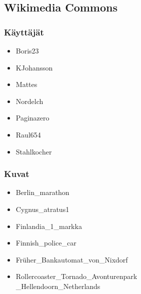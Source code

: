 \subsection*{Wikimedia Commons}
\begin{minipage}[t]{0.33\textwidth}
\subsubsection*{Käyttäjät}
\begin{itemize}
\item Boris23
\item KJohansson
\item Mattes
\item Nordelch
\item Paginazero
\item Raul654
\item Stahlkocher
\end{itemize}
\end{minipage}
\begin{minipage}[t]{0.67\textwidth}
\subsubsection*{Kuvat}
\begin{itemize}
\item Berlin\_marathon
\item Cygnus\_atratus1
\item Finlandia\_1\_markka
\item Finnish\_police\_car
\item Früher\_Bankautomat\_von\_Nixdorf
\item Rollercoaster\_Tornado\_Avonturenpark \\
      \_Hellendoorn\_Netherlands
\end{itemize}
\end{minipage}
